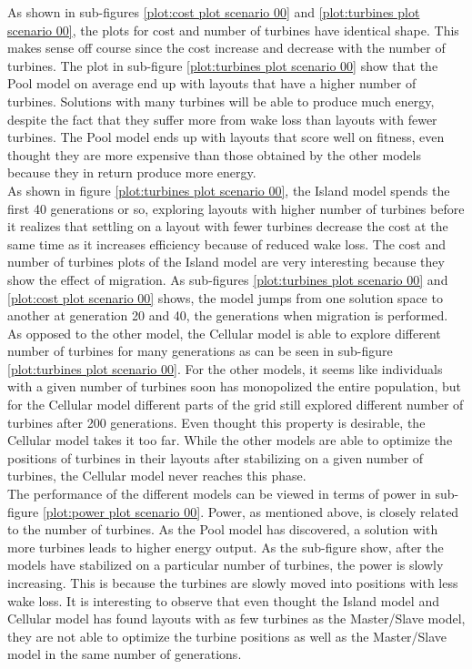 \noindent As shown in sub-figures \ref{plot:cost plot scenario 00} and \ref{plot:turbines plot scenario 00}, the plots for cost and number of turbines have identical shape. This makes sense off course since the cost increase and decrease with the number of turbines. The plot in sub-figure \ref{plot:turbines plot scenario 00} show that the Pool model on average end up with layouts that have a higher number of turbines. Solutions with many turbines will be able to produce much energy, despite the fact that they suffer more from wake loss than layouts with fewer turbines. The Pool model ends up with layouts that score well on fitness, even thought they are more expensive than those obtained by the other models because they in return produce more energy.\\

\noindent As shown in figure \ref{plot:turbines plot scenario 00}, the Island model spends the first 40 generations or so, exploring layouts with higher number of turbines before it realizes that settling on a layout with fewer turbines decrease the cost at the same time as it increases efficiency because of reduced wake loss. The cost and number of turbines plots of the Island model are very interesting because they show the effect of migration. As sub-figures \ref{plot:turbines plot scenario 00} and \ref{plot:cost plot scenario 00} shows, the model jumps from one solution space to another at generation 20 and 40, the generations when migration is performed. \\

\noindent As opposed to the other model, the Cellular model is able to explore different number of turbines for many generations as can be seen in sub-figure \ref{plot:turbines plot scenario 00}. For the other models, it seems like individuals with a given number of turbines soon has monopolized the entire population, but for the Cellular model different parts of the grid still explored different number of turbines after 200 generations. Even thought this property is desirable, the Cellular model takes it too far. While the other models are able to optimize the positions of turbines in their layouts after stabilizing on a given number of turbines, the Cellular model never reaches this phase.\\

\noindent The performance of the different models can be viewed in terms of power in sub-figure \ref{plot:power plot scenario 00}. Power, as mentioned above, is closely related to the number of turbines. As the Pool model has discovered, a solution with more turbines leads to higher energy output. As the sub-figure show, after the models have stabilized on a particular number of turbines, the power is slowly increasing. This is because the turbines are slowly moved into positions with less wake loss. It is interesting to observe that even thought the Island model and Cellular model has found layouts with as few turbines as the Master/Slave model, they are not able to optimize the turbine positions as well as the Master/Slave model in the same number of generations. \\

